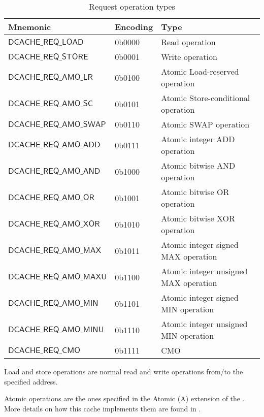 \documentclass[10pt,titlepage,twoside]{book}
\begin{document}
\begin{table}[h!]
\begin{center}
\caption{Request operation types}%
{\footnotesize
\begin{tabular}{lll}
  \toprule
  \textbf{Mnemonic}
  & \textbf{Encoding}
  & \textbf{Type} \\
  \midrule
  $\mathsf{DCACHE\_REQ\_LOAD}$
  & 0b0000
  & Read operation \\
  \midrule
  $\mathsf{DCACHE\_REQ\_STORE}$
  & 0b0001
  & Write operation \\
  \midrule
  $\mathsf{DCACHE\_REQ\_AMO\_LR}$
  & 0b0100
  & Atomic Load-reserved operation \\
  \midrule
  $\mathsf{DCACHE\_REQ\_AMO\_SC}$
  & 0b0101
  & Atomic Store-conditional operation \\
  \midrule
  $\mathsf{DCACHE\_REQ\_AMO\_SWAP}$
  & 0b0110
  & Atomic SWAP operation \\
  \midrule
  $\mathsf{DCACHE\_REQ\_AMO\_ADD}$
  & 0b0111
  & Atomic integer ADD operation \\
  \midrule
  $\mathsf{DCACHE\_REQ\_AMO\_AND}$
  & 0b1000
  & Atomic bitwise AND operation \\
  \midrule
  $\mathsf{DCACHE\_REQ\_AMO\_OR}$
  & 0b1001
  & Atomic bitwise OR operation \\
  \midrule
  $\mathsf{DCACHE\_REQ\_AMO\_XOR}$
  & 0b1010
  & Atomic bitwise XOR operation \\
  \midrule
  $\mathsf{DCACHE\_REQ\_AMO\_MAX}$
  & 0b1011
  & Atomic integer signed MAX operation \\
  \midrule
  $\mathsf{DCACHE\_REQ\_AMO\_MAXU}$
  & 0b1100
  & Atomic integer unsigned MAX operation \\
  \midrule
  $\mathsf{DCACHE\_REQ\_AMO\_MIN}$
  & 0b1101
  & Atomic integer signed MIN operation \\
  \midrule
  $\mathsf{DCACHE\_REQ\_AMO\_MINU}$
  & 0b1110
  & Atomic integer unsigned MIN operation \\
  \midrule
  $\mathsf{DCACHE\_REQ\_CMO}$
  & 0b1111
  & \acf*{CMO} \\
\end{tabular}}
\end{center}
\end{table}

Load and store operations are normal read and write operations from/to the specified address.

Atomic operations are the ones specified in the Atomic (A) extension of the \cite{RISCV_spec}.
More details on how this cache implements them are found in .
\end{document}

